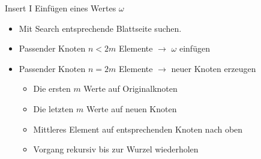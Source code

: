 \documentclass[]{beamer}
\begin{document}
\begin{frame}{Insert I}
Einfügen eines Wertes $\omega$
\begin{itemize}
	\item Mit Search entsprechende Blattseite suchen.
	\item Passender Knoten $n<2m$ Elemente $\rightarrow$ $\omega$ einfügen
	\item Passender Knoten $n=2m$ Elemente $\rightarrow$ neuer Knoten erzeugen
	\begin{itemize}
		\item Die ersten $m$ Werte auf Originalknoten
		\item Die letzten $m$ Werte auf neuen Knoten
		\item Mittleres Element auf entsprechenden Knoten nach oben
		\item Vorgang rekursiv bis zur Wurzel wiederholen
	\end{itemize}
\end{itemize}
\end{frame}
\end{document}
